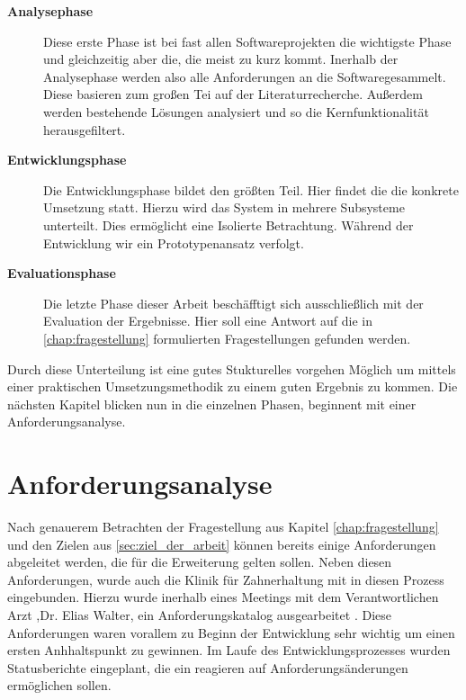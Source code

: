 \begin{description}
	\item[\textbf{Analysephase}] Diese erste Phase ist bei fast allen Softwareprojekten
		die wichtigste Phase und gleichzeitig aber die, die meist zu kurz kommt. Inerhalb
		der Analysephase werden also alle Anforderungen an die Softwaregesammelt.
		Diese basieren zum großen Tei auf der Literaturrecherche. Außerdem werden bestehende
		Lösungen analysiert und so die Kernfunktionalität herausgefiltert.

	\item[\textbf{Entwicklungsphase}] Die Entwicklungsphase bildet den größten Teil.
		Hier findet die die konkrete Umsetzung statt. Hierzu wird das System in mehrere
		Subsysteme unterteilt. Dies ermöglicht eine Isolierte Betrachtung. Während der
		Entwicklung wir ein Prototypenansatz verfolgt.

	\item[\textbf{Evaluationsphase}] Die letzte Phase dieser Arbeit beschäfftigt sich
		ausschließlich mit der Evaluation der Ergebnisse. Hier soll eine Antwort auf
		die in \ref{chap:fragestellung} formulierten Fragestellungen gefunden werden.
\end{description}

Durch diese Unterteilung ist eine gutes Stukturelles vorgehen Möglich um mittels
einer praktischen Umsetzungsmethodik zu einem guten Ergebnis zu kommen. Die nächsten
Kapitel blicken nun in die einzelnen Phasen, beginnent mit einer
Anforderungsanalyse.

\section{Anforderungsanalyse}
\label{sec:anforderungsanalyse} Nach genauerem Betrachten der Fragestellung aus
Kapitel \ref{chap:fragestellung} und den Zielen aus \ref{sec:ziel_der_arbeit}
können bereits einige Anforderungen abgeleitet werden, die für die Erweiterung gelten
sollen. Neben diesen Anforderungen, wurde auch die Klinik für Zahnerhaltung mit in
diesen Prozess eingebunden. Hierzu wurde inerhalb eines Meetings mit dem
Verantwortlichen Arzt ,Dr. Elias Walter, ein Anforderungskatalog ausgearbeitet \citep[vgl.][]{walter2025}.
Diese Anforderungen waren vorallem zu Beginn der Entwicklung sehr wichtig um einen
ersten Anhhaltspunkt zu gewinnen. Im Laufe des Entwicklungsprozesses wurden
Statusberichte eingeplant, die ein reagieren auf Anforderungsänderungen ermöglichen
sollen.

